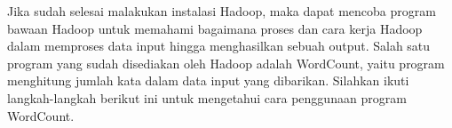 \documentclass[a4paper]{tufte-handout}
\begin{document}
\begin{comment}
\clearpage
\newday{\#10 - 15 Desember 2022 menggantikan 10 November 2022
\footnote{Mahasiswa yang hadir:
\begin{enumerate}
\item Adinda Awaliah
\item Adjie Yusmunandar
\item Arya Saputra
\item Cut Opy Mandalisa
\item Faiza Yuwafiqi
\item Jihan Dwi Sarah
\item M. Ikhsan
\item Muhammad Ikrammullah
\item Muhammad Munawir
\item Nadzura Kumaira
\item Nurani Harum Fardaniah
\item Nurul Aflah
\item Rauzatinur Syah
\item Resha Russita
\item Rizki Ilhami
\item Salsabila Irmanda
\item Taravia Fauzah
\end{enumerate}}}
\end{comment}


Jika sudah selesai malakukan instalasi Hadoop, maka dapat mencoba program bawaan Hadoop untuk memahami bagaimana proses dan cara kerja Hadoop dalam memproses data input hingga menghasilkan sebuah output. Salah satu program yang sudah disediakan oleh Hadoop adalah WordCount, yaitu program menghitung jumlah kata dalam data input yang dibarikan. Silahkan ikuti langkah-langkah berikut ini untuk mengetahui cara penggunaan program WordCount.
\end{document}
